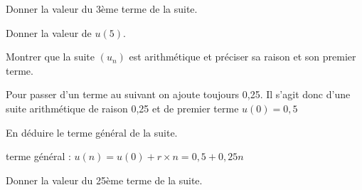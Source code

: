 \documentclass[11pt,a4paper]{article}  %
\begin{document}
\begin{enumMet}
	\item Donner la valeur du 3ème terme de la suite. 
	\item Donner la valeur de $u(5)$. 
	\item Montrer que la suite $\left(u_n\right)$ est arithmétique et préciser sa raison et son premier terme.
	\begin{corrBox}
		Pour passer d'un terme au suivant on ajoute toujours 0,25. Il s'agit donc d'une suite arithmétique de raison 0,25 et de premier terme $u(0)=0,5$	
	\end{corrBox}
	\item En déduire le terme général de la suite.
	\begin{corrBox}
		terme général : $u(n)=u(0)+r\times n=0,5+0,25n$
	\end{corrBox}
	\item Donner la valeur du 25ème terme de la suite. 
\end{enumMet}
\end{document}
